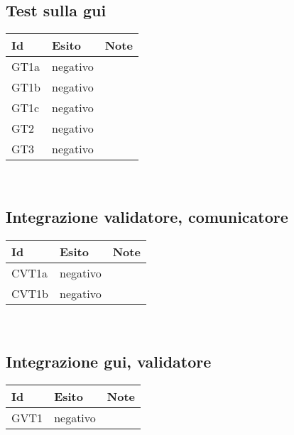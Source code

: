 \subsection{Test sulla gui}
\begin{center}
\begin{tabular}{|p{1cm}|p{1.6cm}|p{8.4cm}|} \hline
\textbf{Id} & \textbf{Esito} & \textbf{Note} \\ \hline
GT1a & negativo & \\ \hline
GT1b & negativo & \\ \hline
GT1c & negativo & \\ \hline
GT2 & negativo & \\ \hline
GT3 & negativo & \\ \hline
\end{tabular} \\
\end{center}

\subsection{Integrazione validatore, comunicatore}
\begin{center}
\begin{tabular}{|p{1cm}|p{1.6cm}|p{8.4cm}|} \hline
\textbf{Id} & \textbf{Esito} & \textbf{Note} \\ \hline
CVT1a & negativo & \\ \hline
CVT1b & negativo & \\ \hline
\end{tabular} \\
\end{center}

\subsection{Integrazione gui, validatore}
\begin{center}
\begin{tabular}{|p{1cm}|p{1.6cm}|p{8.4cm}|} \hline
\textbf{Id} & \textbf{Esito} & \textbf{Note} \\ \hline
GVT1 & negativo & \\ \hline
\end{tabular} \\
\end{center}

